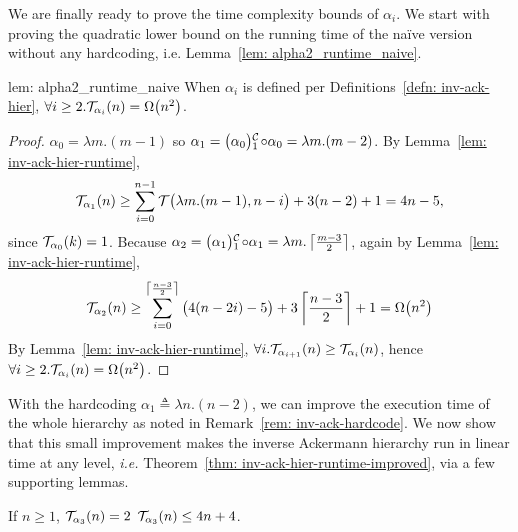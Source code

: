 \noindent We are finally ready to prove the time complexity bounds of $\alpha_i$. We start with proving the quadratic lower bound on the running time of the na\"ive version without any hardcoding, i.e. Lemma~\ref{lem: alpha2_runtime_naive}.

\begin{uselemcounterof}{lem: alpha2_runtime_naive}
	When $\alpha_i$ is defined per Definitions~\ref{defn: inv-ack-hier}, $\forall i\ge 2. \mathcal{T}_{\alpha_i}(n) = \Omega\big(n^2\big)$.
\end{uselemcounterof}

\begin{proof}
	$\alpha_0 = \lambda m.(m-1)$ so $\alpha_1 = \cdt{\big(\alpha_0\big)}{1}\circ \alpha_0 = \lambda m.(m - 2)$. By Lemma~\ref{lem: inv-ack-hier-runtime},
	\begin{equation*}
	\mathcal{T}_{\alpha_1}(n) \ge \sum_{i=0}^{n-1} \mathcal{T}\big(\lambda m.(m-1), n - i\big) + 3(n - 2) + 1 = 4n - 5\text{,}
	\end{equation*}
	since $\mathcal{T}_{\alpha_0}(k) = 1$. Because $\alpha_2 = \cdt{\big(\alpha_1\big)}{1}\circ \alpha_1 = \lambda m.\left\lceil \frac{m-3}{2} \right\rceil$, again by Lemma~\ref{lem: inv-ack-hier-runtime},
	\begin{equation*}
	\mathcal{T}_{\alpha_2}(n)
	\ge \sum_{i=0}^{\left\lceil \frac{n-3}{2} \right\rceil} \big(4(n-2i) - 5\big) + 3\left\lceil \frac{n-3}{2} \right\rceil + 1
	= \Omega\big(n^2\big)
	\end{equation*}
	By Lemma~\ref{lem: inv-ack-hier-runtime}, $\forall i. \mathcal{T}_{\alpha_{i+1}}(n)\ge \mathcal{T}_{\alpha_i}(n)$, hence $\forall i\ge 2. \mathcal{T}_{\alpha_i}(n) = \Omega\big(n^2\big)$.
\end{proof}


With the hardcoding $\alpha_1 \triangleq \lambda n.(n - 2)$, we can improve the execution time of the whole hierarchy as noted in Remark~\ref{rem: inv-ack-hardcode}. We now show that this small improvement makes the inverse Ackermann hierarchy run in linear time at any level, \emph{i.e.} Theorem~\ref{thm: inv-ack-hier-runtime-improved}, via a few supporting lemmas.

\begin{lem} \label{lem: inv-ack-3-runtime}
	If $n\ge 1$, $\mathcal{T}_{\alpha_3}(n) = 2$ $\mathcal{T}_{\alpha_3}(n) \le 4n + 4$.
\end{lem}

